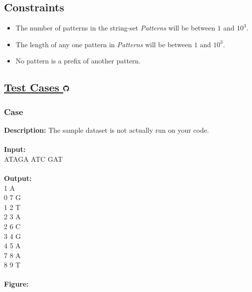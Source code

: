 \documentclass{article}
\newcommand{\code}[1]{{\fontfamily{pcr}\selectfont #1}}
\newcommand{\gitlogo}{\includegraphics[height=12.5]{c0/gitlogo.png}}
\begin{document}
\subsection*{Constraints}
\begin{itemize}
    \item The number of patterns in the string-set \emph{Patterns} will be between $1$ and $10^3$.
    \item The length of any one pattern in \emph{Patterns} will be between $1$ and $10^3$.
    \item No pattern is a prefix of another pattern.
\end{itemize}
\pagebreak

\subsection*{\href{https://github.com/rjeveloff/BA_problemregister/tree/main/test_cases/chapter_9/9A}{Test Cases \gitlogo}}
\subsubsection*{Case }
\hline \vspace{5}
\textbf{Description:} The sample dataset is not actually run on your code.\\ \\
\noindent \textbf{Input:}\\
\code{ATAGA ATC GAT} \\ \\
\textbf{Output:}\\
\code{0 1 A \\ 0 7 G \\ 1 2 T \\ 2 3 A \\ 2 6 C \\ 3 4 G \\ 4 5 A \\ 7 8 A \\ 8 9 T}\\ \\
\noindent \textbf{Figure:}
\end{document}
